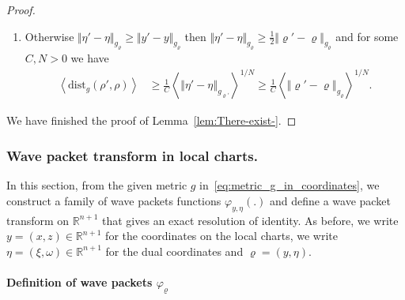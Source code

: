 \documentclass[10pt]{amsart}
\theoremstyle{definition}\newtheorem{defi}[theo]{Definition}\newtheorem{rema}[theo]{Remark}\newtheorem{exam}[theo]{Example}\newtheorem{exem}[theo]{Example}\newtheorem{nota}[theo]{Notation}
\newcommand{\dist}{\mathrm{dist}}
\newcommand{\bbR}{\mathbb{R}}
\begin{document}
\begin{proof}
\begin{enumerate}
\begin{enumerate}
\begin{align*}
& \geq\frac{1}{C}\left\langle \left\Vert \varrho'-\varrho\right\Vert _{g_{\varrho}}\right\rangle ^{1/N}.
\end{align*}
\item Otherwise $\Vert \eta'-\eta\Vert _{g_{\varrho}}\geq\Vert y'-y\Vert _{g_{\varrho}}$ then $\Vert \eta'-\eta\Vert _{g_{\varrho}}\geq\frac{1}{2}\Vert \varrho'-\varrho\Vert _{g_{\varrho}}$ and for some $C,N>0$ we have
\begin{align*}
\left\langle \dist_{g}\left(\rho',\rho\right)\right\rangle & \geq\frac{1}{C}\left\langle \left\Vert \eta'-\eta\right\Vert _{g_{\varrho'}}\right\rangle ^{1/N}\geq\frac{1}{C}\left\langle \left\Vert \varrho'-\varrho\right\Vert _{g_{\varrho}}\right\rangle ^{1/N}.
\end{align*}
\end{enumerate}
\end{enumerate}
We have finished the proof of Lemma~\ref{lem:There-exist-}.
\end{proof}

\subsubsection{\label{subsec:Bargmann-transform-on}
Wave packet transform in local charts.}

In this section, from the given metric $g$ in~\eqref{eq:metric_g_in_coordinates}, we construct a family of wave packets functions $\varphi_{y,\eta}(.)$ and define a wave packet transform on $\bbR^{n+1}$ that gives an exact resolution of identity. As before, we write $y=(x,z)\in\bbR^{n+1}$ for the coordinates on the local charts, we write $\eta=(\xi,\omega)\in\bbR^{n+1}$ for the dual coordinates and $\varrho=(y,\eta)$.

\paragraph{Definition of wave packets $\varphi_{\varrho}$}
\end{document}

